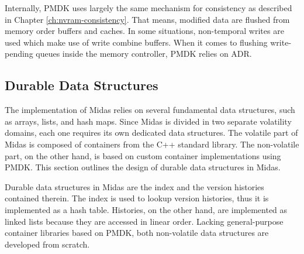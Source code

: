 Internally, PMDK uses largely the same mechanism for consistency as described in
Chapter \ref{ch:nvram-consistency}. That means, modified data are flushed from
memory order buffers and caches. In some situations, non-temporal writes are
used which make use of write combine buffers. When it comes to flushing
write-pending queues inside the memory controller, PMDK relies on ADR.


\subsection{Durable Data Structures}
\label{ch:impl-data}


The implementation of Midas relies on several fundamental data structures, such
as arrays, lists, and hash maps. Since Midas is divided in two separate
volatility domains, each one requires its own dedicated data structures. The
volatile part of Midas is composed of containers from the C++ standard library.
The non-volatile part, on the other hand, is based on custom container
implementations using PMDK. This section outlines the design of durable data
structures in Midas.


Durable data structures in Midas are the index and the version histories
contained therein. The index is used to lookup version histories, thus it is
implemented as a hash table. Histories, on the other hand, are implemented as
linked lists because they are accessed in linear order. Lacking general-purpose
container libraries based on PMDK, both non-volatile data structures are
developed from scratch.

